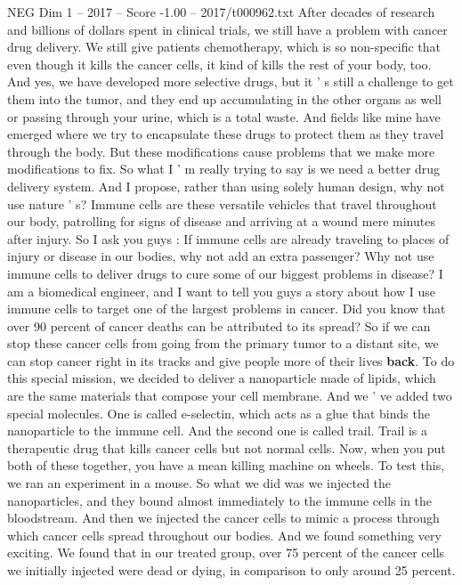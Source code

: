 \begin{textsample}{NEG Dim 1 – 2017 – Score -1.00 – 2017/t000962.txt}  \label{ex:f1_neg_025}
After decades of research and billions of dollars spent in clinical trials, we still have a problem with cancer drug delivery.
We still give patients chemotherapy, which is so non-specific that even though it kills the cancer cells, it kind of kills the rest of your body, too.
And yes, we have developed more selective drugs, but it ' s still a challenge to get them into the tumor, and they end up accumulating in the other organs as well or passing through your urine, which is a total waste.
And fields like mine have emerged where we try to encapsulate these drugs to protect them as they travel through the body.
But these modifications cause problems that we make more modifications to fix.
So what I ' m really trying to say is we need a better drug delivery system.
And I propose, rather than using solely human design, why not use nature ' s?
Immune cells are these versatile vehicles that travel throughout our body, patrolling for signs of disease and arriving at a wound mere minutes after injury.
So I ask you guys : If immune cells are already traveling to places of injury or disease in our bodies, why not add an extra passenger?
Why not use immune cells to deliver drugs to cure some of our biggest problems in disease?
I am a biomedical engineer, and I want to tell you guys a story about how I use immune cells to target one of the largest problems in cancer.
Did you know that over 90 percent of cancer deaths can be attributed to its spread?
So if we can stop these cancer cells from going from the primary tumor to a distant site, we can stop cancer right in its tracks and give people more of their lives \textbf{back}.
To do this special mission, we decided to deliver a nanoparticle made of lipids, which are the same materials that compose your cell membrane.
And we ' ve added two special molecules.
One is called e-selectin, which acts as a glue that binds the nanoparticle to the immune cell.
And the second one is called trail.
Trail is a therapeutic drug that kills cancer cells but not normal cells.
Now, when you put both of these together, you have a mean killing machine on wheels.
To test this, we ran an experiment in a mouse.
So what we did was we injected the nanoparticles, and they bound almost immediately to the immune cells in the bloodstream.
And then we injected the cancer cells to mimic a process through which cancer cells spread throughout our bodies.
And we found something very exciting.
We found that in our treated group, over 75 percent of the cancer cells we initially injected were dead or dying, in comparison to only around 25 percent.

\end{textsample}
